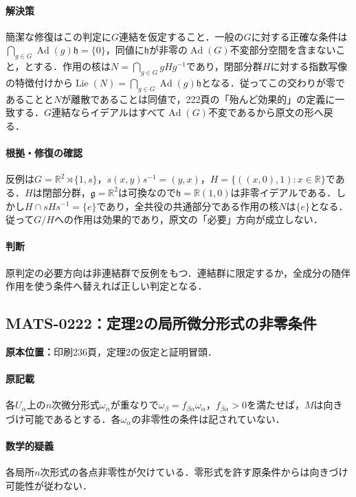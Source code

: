\documentclass[a4paper,10pt]{ltjsarticle}
\begin{document}
\paragraph{解決策}簡潔な修復はこの判定に$G$連結を仮定すること．一般の$G$に対する正確な条件は$\bigcap_{g\in G}\operatorname{Ad}(g)\mathfrak h=\{0\}$，同値に$\mathfrak h$が非零の$\operatorname{Ad}(G)$不変部分空間を含まないこと，とする．作用の核は$N=\bigcap_{g\in G}gHg^{-1}$であり，閉部分群$H$に対する指数写像の特徴付けから$\operatorname{Lie}(N)=\bigcap_{g\in G}\operatorname{Ad}(g)\mathfrak h$となる．従ってこの交わりが零であることと$N$が離散であることは同値で，222頁の「殆んど効果的」の定義に一致する．$G$連結ならイデアルはすべて$\operatorname{Ad}(G)$不変であるから原文の形へ戻る．

\paragraph{根拠・修復の確認}反例は$G=\mathbb R^2\rtimes\{1,s\}$，$s(x,y)s^{-1}=(y,x)$，$H=\{((x,0),1):x\in\mathbb R\}$である．$H$は閉部分群，$\mathfrak g=\mathbb R^2$は可換なので$\mathfrak h=\mathbb R(1,0)$は非零イデアルである．しかし$H\cap sHs^{-1}=\{e\}$であり，全共役の共通部分である作用の核$N$は$\{e\}$となる．従って$G/H$への作用は効果的であり，原文の「必要」方向が成立しない．

\paragraph{判断}原判定の必要方向は非連結群で反例をもつ．連結群に限定するか，全成分の随伴作用を使う条件へ替えれば正しい判定となる．


\subsection*{MATS-0222：定理2の局所微分形式の非零条件}\label{math:MATS-0222}
\noindent\textbf{原本位置：}印刷236頁，定理2の仮定と証明冒頭．

\paragraph{原記載}各$U_\alpha$上の$n$次微分形式$\omega_\alpha$が重なりで$\omega_\beta=f_{\beta\alpha}\omega_\alpha$，$f_{\beta\alpha}>0$を満たせば，$M$は向きづけ可能であるとする．各$\omega_\alpha$の非零性の条件は記されていない．

\paragraph{数学的疑義}各局所$n$次形式の各点非零性が欠けている．零形式を許す原条件からは向きづけ可能性が従わない．
\end{document}
